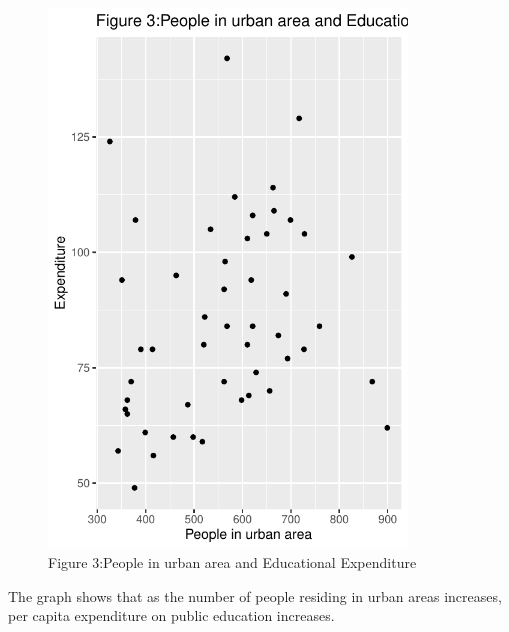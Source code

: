 \documentclass[12pt,letterpaper]{article}
\begin{document}
\begin{itemize}
		  
		\vspace{.5cm}
	    \begin{figure}\centering
			\caption{Figure 3:People in urban area and Educational Expenditure}
			\includegraphics[width=0.85\textwidth]{Rplot3.pdf}
	     \end{figure}
		The graph shows that as the number of people residing in urban areas increases, per capita expenditure on public education increases.
		\vspace{.5cm}	
		

\end{itemize}
\end{document}

